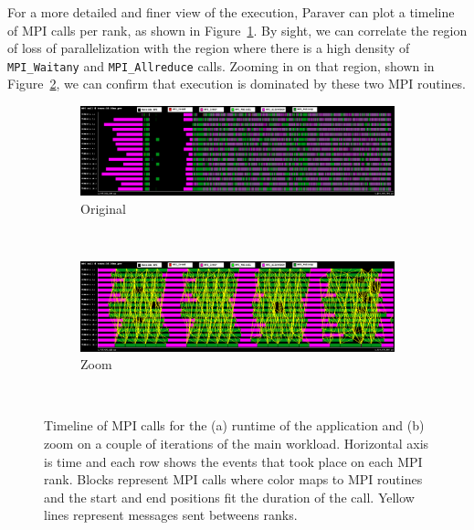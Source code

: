 \documentclass{juliacon}
\begin{document}
For a more detailed and finer view of the execution, Paraver can plot a timeline of MPI calls per rank, as shown in Figure~\ref{fig:timeline:orig}. By sight, we can correlate the region of loss of parallelization with the region where there is a high density of \texttt{MPI\_Waitany} and \texttt{MPI\_Allreduce} calls. Zooming in on that region, shown in Figure~\ref{fig:timeline:zoom}, we can confirm that execution is dominated by these two MPI routines.

\begin{figure}[h]
    \centering
    \begin{subfigure}{\linewidth}
        \includegraphics[width=\linewidth]{MPI_call@trace-16-10ms.png}
        \caption{Original}
        \label{fig:timeline:orig}
    \end{subfigure}
    \\\vspace{1em}
    \begin{subfigure}{\linewidth}
        \includegraphics[width=\linewidth]{MPI_call@trace-16-10ms-zoom.png}
        \caption{Zoom}
        \label{fig:timeline:zoom}
    \end{subfigure}
    \\\vspace{1em}
    \caption{Timeline of MPI calls for the (a) runtime of the application and (b) zoom on 
 a couple of iterations of the main workload. Horizontal axis is time and each row shows the events that took place on each MPI rank. Blocks represent MPI calls where color maps to MPI routines and the start and end positions fit the duration of the call. Yellow lines represent messages sent betweens ranks.}
    \label{fig:timeline}
\end{figure}
\end{document}
